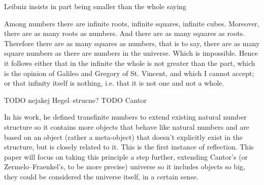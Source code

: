 \documentclass[12pt,a4paper]{article}
\begin{document}
Leibniz insists in part being smaller than the whole saying
\begin{displayquote}
Among numbers there are infinite roots, infinite squares, infinite cubes. Moreover, there are
as many roots as numbers. And there are as many squares as roots. Therefore there are as
many squares as numbers, that is to say, there are as many square numbers as there are
numbers in the universe. Which is impossible. Hence it follows either that in the infinite the
whole is not greater than the part, which is the opinion of Galileo and Gregory of St.
Vincent, and which I cannot accept; or that infinity itself is nothing, i.e. that it is not one and
not a whole. %
\end{displayquote}
TODO  nejakej Hegel--strucne?
TODO Cantor

In his work, he defined transfinite numbers to extend existing natural number %
structure so it contains more objects that behave like natural numbers and are based on an object (rather a meta-object) that doesn't explicitly exist in the structure, but is closely related to it. This is the first instance of reflection. 
This paper will focus on taking this principle a step further, extending Cantor's (or Zermelo–Fraenkel's, to be more precise) universe so it includes objects so big, they could be considered the universe itself, in a certain sense. %
\end{document}
